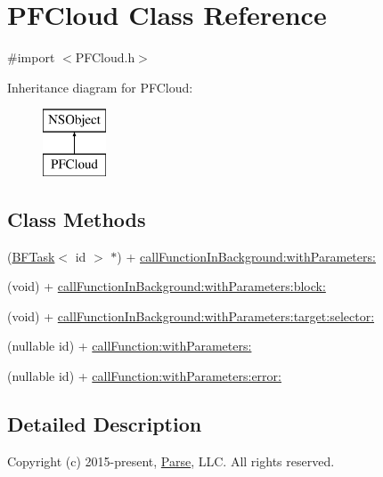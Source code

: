 \hypertarget{interface_p_f_cloud}{}\section{P\+F\+Cloud Class Reference}
\label{interface_p_f_cloud}


{\ttfamily \#import $<$P\+F\+Cloud.\+h$>$}

Inheritance diagram for P\+F\+Cloud\+:\begin{figure}[H]
\begin{center}
\leavevmode
\includegraphics[height=2.000000cm]{interface_p_f_cloud}
\end{center}
\end{figure}
\subsection*{Class Methods}
\begin{DoxyCompactItemize}
\item 
(\hyperlink{class_b_f_task}{B\+F\+Task}$<$ id $>$ $\ast$) + \hyperlink{interface_p_f_cloud_a9457342d0b452bc833d1cd8911f0cb37}{call\+Function\+In\+Background\+:with\+Parameters\+:}
\item 
(void) + \hyperlink{interface_p_f_cloud_a920ae088d40ff9f12d19cd7dc8a6dc9a}{call\+Function\+In\+Background\+:with\+Parameters\+:block\+:}
\item 
(void) + \hyperlink{interface_p_f_cloud_ac66d0c219ea8bf3374a50a65f56b2040}{call\+Function\+In\+Background\+:with\+Parameters\+:target\+:selector\+:}
\item 
(nullable id) + \hyperlink{interface_p_f_cloud_a14a5d00feb7ce9dba38888145948a1ed}{call\+Function\+:with\+Parameters\+:}
\item 
(nullable id) + \hyperlink{interface_p_f_cloud_a50b8989c8f64013800ec67d3c116c98c}{call\+Function\+:with\+Parameters\+:error\+:}
\end{DoxyCompactItemize}


\subsection{Detailed Description}
Copyright (c) 2015-\/present, \hyperlink{interface_parse}{Parse}, L\+L\+C. All rights reserved.

